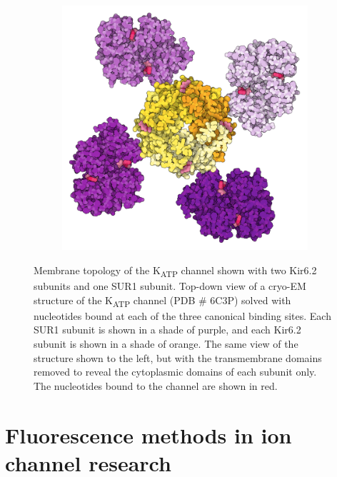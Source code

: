 \begin{figure}[h]
\begin{subfigure}[t]{0.45\textwidth}
	\end{subfigure}
	\hfill
	\begin{subfigure}[t]{0.45\textwidth}
		\caption{}\label{ch1fig:sur_ctd}
		\centering
		\includegraphics[width=\textwidth]{sur_topdown_ctd_propellor.pdf}
	\end{subfigure}
	\caption[K\textsubscript{ATP} architecture and nucleotide regulation]{
		 Membrane topology of the K\textsubscript{ATP} channel shown with two Kir6.2 subunits and one SUR1 subunit.
		 Top-down view of a cryo-EM structure of the K\textsubscript{ATP} channel (PDB \# 6C3P) solved with nucleotides bound at each of the three canonical binding sites.
		Each SUR1 subunit is shown in a shade of purple, and each Kir6.2 subunit is shown in a shade of orange.
		 The same view of the structure shown to the left, but with the transmembrane domains removed to reveal the cytoplasmic domains of each subunit only.
		The nucleotides bound to the channel are shown in red.
	}
\end{figure}

\section{Fluorescence methods in ion channel research}

